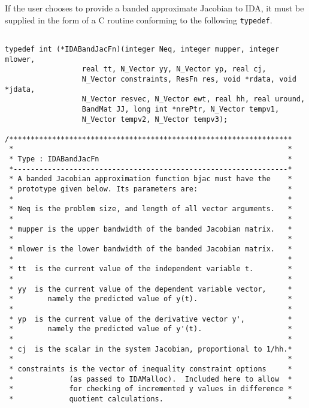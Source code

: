 If the user chooses to provide a banded approximate Jacobian to IDA,
it must be supplied in the form of a C routine conforming to the
following {\tt typedef}.

\small
\begin{verbatim}
  
typedef int (*IDABandJacFn)(integer Neq, integer mupper, integer mlower,
                  real tt, N_Vector yy, N_Vector yp, real cj, 
                  N_Vector constraints, ResFn res, void *rdata, void *jdata, 
                  N_Vector resvec, N_Vector ewt, real hh, real uround, 
                  BandMat JJ, long int *nrePtr, N_Vector tempv1,
                  N_Vector tempv2, N_Vector tempv3);
 
/******************************************************************
 *                                                                *           
 * Type : IDABandJacFn                                            *
 *----------------------------------------------------------------*
 * A banded Jacobian approximation function bjac must have the    *
 * prototype given below. Its parameters are:                     *
 *                                                                *
 * Neq is the problem size, and length of all vector arguments.   *
 *                                                                *
 * mupper is the upper bandwidth of the banded Jacobian matrix.   *
 *                                                                *
 * mlower is the lower bandwidth of the banded Jacobian matrix.   *
 *                                                                *
 * tt  is the current value of the independent variable t.        *
 *                                                                *
 * yy  is the current value of the dependent variable vector,     *
 *        namely the predicted value of y(t).                     *
 *                                                                *
 * yp  is the current value of the derivative vector y',          *
 *        namely the predicted value of y'(t).                    *
 *                                                                *
 * cj  is the scalar in the system Jacobian, proportional to 1/hh.*
 *                                                                *
 * constraints is the vector of inequality constraint options     *
 *             (as passed to IDAMalloc).  Included here to allow  *
 *             for checking of incremented y values in difference *
 *             quotient calculations.                             *

\end{verbatim}
